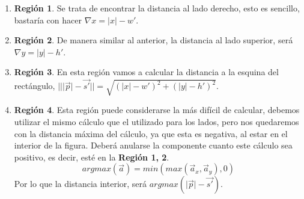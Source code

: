 \begin{enumerate}
    \item \textbf{Región 1}. Se trata de encontrar la distancia al lado derecho, esto es sencillo, bastaría con hacer \(\nabla x=\vert x\vert-w'\).
    \item \textbf{Región 2}. De manera similar al anterior, la distancia al lado superior, será \(\nabla y=\vert y\vert-h'\).
    \item \textbf{Región 3}. En esta región vamos a calcular la distancia a la esquina del rectángulo, \(\vert\vert \vert\Vec{p}\vert-\Vec{s'}\vert\vert = \sqrt{\left(\vert x\vert-w'\right)^2+\left(\vert y\vert-h'\right)^2}\).
    \item \textbf{Región 4}. Esta región puede considerarse la más difícil de calcular, debemos utilizar el mismo cálculo que el utilizado para los lados, pero nos quedaremos con la distancia máxima del cálculo, ya que esta es negativa, al estar en el interior de la figura. Deberá anularse la componente cuanto este cálculo sea positivo, es decir, esté en la \textbf{Región 1, 2}.
    \[argmax(\Vec{a})=min(max(\Vec{a}_x, \Vec{a}_y), 0)\]
    Por lo que la distancia interior, será \(argmax(\vert\Vec{p}\vert-\Vec{s'})\).
\end{enumerate}

